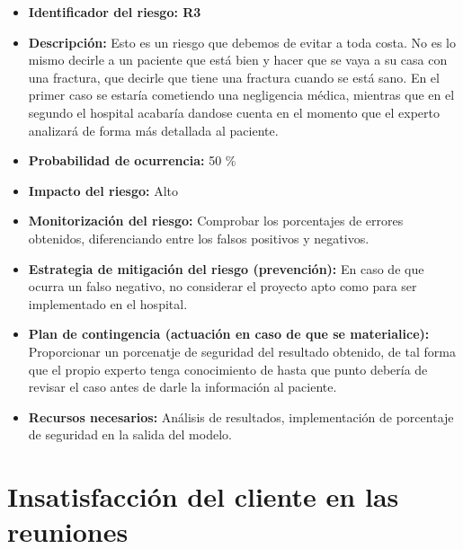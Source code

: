 \begin{itemize}
	\item \textbf{Identificador del riesgo: R3 }
	\item \textbf{Descripción:} Esto es un riesgo que debemos de evitar a toda costa. No es lo mismo decirle a un paciente que está bien y hacer que se vaya a su casa con una fractura, que decirle que tiene una fractura cuando se está sano. En el primer caso se estaría cometiendo una negligencia médica, mientras que en el segundo el hospital acabaría dandose cuenta en el momento que el experto analizará de forma más detallada al paciente. 
	\item \textbf{Probabilidad de ocurrencia: } 50 \%
	\item \textbf{Impacto del riesgo: } Alto
	\item \textbf{Monitorización del riesgo: } Comprobar los porcentajes de errores obtenidos, diferenciando entre los falsos positivos y negativos. 
	\item \textbf{Estrategia de mitigación del riesgo (prevención): } En caso de que ocurra un falso negativo, no considerar el proyecto apto como para ser implementado en el hospital.
	\item \textbf{Plan de contingencia (actuación en caso de que se materialice): } Proporcionar un porcenatje de seguridad del resultado obtenido, de tal forma que el propio experto tenga conocimiento de hasta que punto debería de revisar el caso antes de darle la información al paciente. 
	\item \textbf{Recursos necesarios: }  Análisis de resultados, implementación de porcentaje de seguridad en la salida del modelo.
\end{itemize}

\section{Insatisfacción del cliente en las reuniones}

